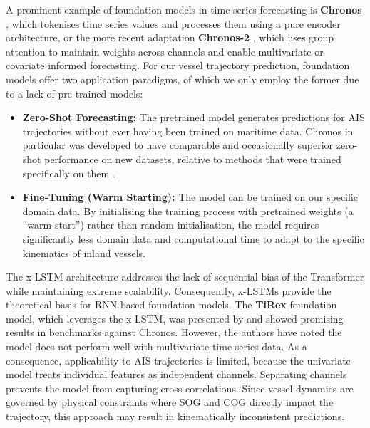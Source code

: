 A prominent example of foundation models in time series forecasting is \textbf{Chronos} \parencite{ansari2024chronoslearninglanguagetime}, which tokenises time series values and processes them using a pure encoder architecture, or the more recent adaptation \textbf{Chronos-2} \parencite{ansari2025chronos2}, which uses group attention to maintain weights across channels and enable multivariate or covariate informed forecasting. For our vessel trajectory prediction, foundation models offer two  application paradigms, of which we only employ the former due to a lack of pre-trained models:
\begin{itemize}
    \item \textbf{Zero-Shot Forecasting:} The pretrained model generates predictions for \ac{AIS} trajectories without ever having been trained on maritime data. Chronos in particular was developed to  have comparable and occasionally superior zero-shot performance on new datasets, relative to methods that were trained specifically on them \parencite{ansari2024chronoslearninglanguagetime}.
    \item \textbf{Fine-Tuning (Warm Starting):} The model can be trained on our specific domain data. By initialising the training process with pretrained weights (a \enquote{warm start}) rather than random initialisation, the model requires significantly less domain data and computational time to adapt to the specific kinematics of inland vessels. %
\end{itemize}%


The \ac{x-LSTM} architecture \parencite{beck2024xlstmextendedlongshortterm} addresses the lack of sequential bias of the Transformer while maintaining extreme scalability. %
Consequently, \acp{x-LSTM} provide the theoretical basis for \ac{RNN}-based foundation models. 
The \textbf{TiRex} foundation model, which leverages the \ac{x-LSTM}, was presented by \textcite{auer2025tirexzeroshotforecastinglongtrex} and showed promising results in benchmarks against Chronos. However, the authors have noted the model does not perform well with multivariate time series data. As a consequence, applicability to \ac{AIS} trajectories is limited, because the univariate model treats individual features as independent channels. Separating channels prevents the model from capturing cross-correlations. Since vessel dynamics are governed by physical constraints where \ac{SOG} and \ac{COG} directly impact the trajectory, this approach may result in kinematically inconsistent predictions. %


